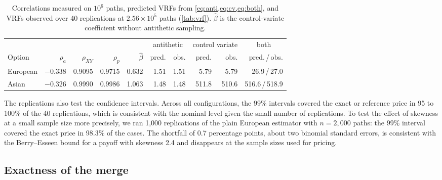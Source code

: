\documentclass[11pt,a4paper]{article}
\begin{document}
\begin{table}[ht]
\centering
\caption{Correlations measured on $10^6$ paths, predicted VRFs from \cref{eq:anti,eq:cv,eq:both}, and VRFs observed over 40 replications at $2.56\times10^5$ paths (\cref{tab:vrf}). $\hat\beta$ is the control-variate coefficient without antithetic sampling.}\label{tab:corr}
\small
\begin{tabular}{lrrrrrrrrr}
\toprule
& & & & & \multicolumn{2}{c}{antithetic} & \multicolumn{2}{c}{control variate} & \multicolumn{1}{c}{both} \\
\cmidrule(lr){6-7}\cmidrule(lr){8-9}\cmidrule(lr){10-10}
Option & $\rho_a$ & $\rho_{XY}$ & $\rho_p$ & $\hat\beta$ & pred. & obs. & pred. & obs. & pred.\,/\,obs. \\
\midrule
European & $-0.338$ & 0.9095 & 0.9715 & 0.632 & 1.51 & 1.51 & 5.79 & 5.79 & 26.9\,/\,27.0 \\
Asian & $-0.326$ & 0.9990 & 0.9986 & 1.063 & 1.48 & 1.48 & 511.8 & 510.6 & 516.6\,/\,518.9 \\
\bottomrule
\end{tabular}
\end{table}

The replications also test the confidence intervals.
Across all configurations, the 99\% intervals covered the exact or reference price in 95 to 100\% of the 40 replications, which is consistent with the nominal level given the small number of replications.
To test the effect of skewness at a small sample size more precisely, we ran 1{,}000 replications of the plain European estimator with $n=2{,}000$ paths: the 99\% interval covered the exact price in 98.3\% of the cases.
The shortfall of 0.7 percentage points, about two binomial standard errors, is consistent with the Berry--Esseen bound for a payoff with skewness 2.4 and disappears at the sample sizes used for pricing.

\subsection{Exactness of the merge}\label{sec:merge-results}
\end{document}
